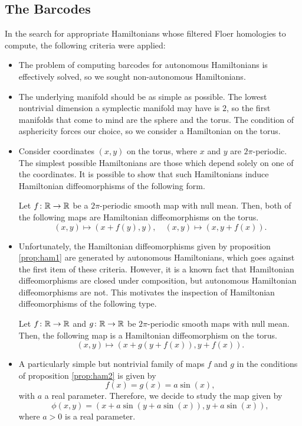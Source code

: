 \subsection{The Barcodes}\label{sec:compute}

In the search for appropriate Hamiltonians whose filtered Floer homologies to compute, the following criteria were applied:
\begin{itemize}
\item The problem of computing barcodes for autonomous Hamiltonians is effectively solved, so we sought non-autonomous Hamiltonians.
\item The underlying manifold should be as simple as possible. The lowest nontrivial dimension a symplectic manifold may have is $2$, so the first manifolds that come to mind are the sphere and the torus. The condition of asphericity forces our choice, so we consider a Hamiltonian on the torus.
\item Consider coordinates $(x,y)$ on the torus, where $x$ and $y$ are $2\pi$-periodic. The simplest possible Hamiltonians are those which depend solely on one of the coordinates. It is possible to show that such Hamiltonians induce Hamiltonian diffeomorphisms of the following form.
\begin{prop}\label{prop:ham1}
Let $f \colon \mathbb{R} \to \mathbb{R}$ be a $2\pi$-periodic smooth map with null mean. Then, both of the following maps are Hamiltonian diffeomorphisms on the torus.
\begin{equation}
(x,y) \mapsto (x + f(y), y), \quad (x,y) \mapsto (x, y + f(x)).
\end{equation}
\end{prop}
\item Unfortunately, the Hamiltonian diffeomorphisms given by proposition \ref{prop:ham1} are generated by autonomous Hamiltonians, which goes against the first item of these criteria. However, it is a known fact that Hamiltonian diffeomorphisms are closed under composition, but autonomous Hamiltonian diffeomorphisms are not. This motivates the inspection of Hamiltonian diffeomorphisms of the following type.
\begin{prop}\label{prop:ham2}
Let $f \colon \mathbb{R} \to \mathbb{R}$ and $g \colon \mathbb{R} \to \mathbb{R}$ be $2\pi$-periodic smooth maps with null mean. Then, the following map is a Hamiltonian diffeomorphism on the torus.
\begin{equation}
(x,y) \mapsto (x + g(y + f(x)), y + f(x)).
\end{equation}
\end{prop}
\item A particularly simple but nontrivial family of maps $f$ and $g$ in the conditions of proposition \ref{prop:ham2} is given by
\begin{equation}
f(x) = g(x) = a \sin(x),
\end{equation}
with $a$ a real parameter. Therefore, we decide to study the map given by
\begin{equation}
\phi(x,y) = (x + a \sin(y + a \sin(x)), y + a \sin(x)),
\end{equation}
where $a > 0$ is a real parameter.
\end{itemize}


